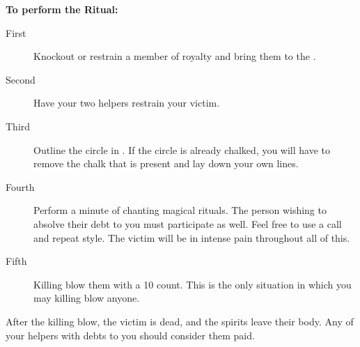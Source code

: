 \documentclass[green]{Kos}
\begin{document}
{\bf To perform the Ritual:}
\begin{description}
\item[First] Knockout or restrain a member of royalty and bring them to the \sRunicCircle{}.
\item[Second] Have your two helpers restrain your victim.
\item [Third] Outline the circle in \iChalk{\MYname}. If the circle is already chalked, you will have to remove the chalk that is present and lay down your own lines.
\item[Fourth] Perform a minute of chanting magical rituals. The person wishing to absolve their debt to you must participate as well. Feel free to use a call and repeat style. The victim will be in intense pain throughout all of this.
\item[Fifth] Killing blow them with a 10 count. This is the only situation in which you may killing blow anyone.
\end{description}

After the killing blow, the victim is dead, and the spirits leave their body. Any of your helpers with debts to you should consider them paid.
\end{document}
